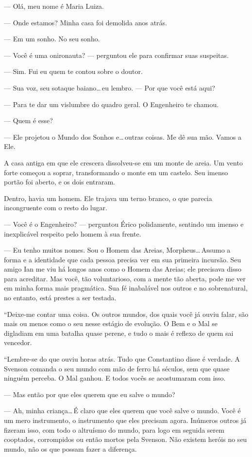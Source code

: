 --- Olá, meu nome é Maria Luiza.

--- Onde estamos? Minha casa foi demolida anos atrás.

--- Em um sonho. No seu sonho.

--- Você é uma onironauta? --- perguntou ele para confirmar suas suspeitas.

--- Sim. Fui eu quem te contou sobre o doutor.

--- Sua voz, seu sotaque baiano\ldots\,eu lembro. --- Por que você está aqui?

--- Para te dar um vislumbre do quadro geral. O Engenheiro te chamou.

--- Quem é esse?

--- Ele projetou o Mundo dos Sonhos e\ldots\,outras coisas. Me dê sua mão.
Vamos a Ele.

A casa antiga em que ele crescera dissolveu-se em um monte de areia. Um vento
forte começou a soprar, transformando o monte em um castelo. Seu imenso portão
foi aberto, e os dois entraram.

Dentro, havia um homem. Ele trajava um terno branco, o que parecia incongruente
com o resto do lugar.

--- Você é o Engenheiro? --- perguntou Érico polidamente, sentindo um imenso e
inexplicável respeito pelo homem à sua frente.

--- Eu tenho muitos nomes. Sou o Homem das Areias, Morpheus\ldots\,Assumo a
forma e a identidade que cada pessoa precisa ver em sua primeira incursão. Seu
amigo Ian me viu há longos anos como o Homem das Areias; ele precisava disso
para acreditar. Mas você, tão voluntarioso, com a mente tão aberta, pode me ver
em minha forma mais pragmática. Sua fé inabalável nos outros e no sobrenatural,
no entanto, está prestes a ser testada.

“Deixe-me contar uma coisa. Os outros mundos, dos quais você já ouviu falar,
são mais ou menos como o seu nesse estágio de evolução. O Bem e o Mal se
digladiam em uma batalha quase perene, e tudo o mais é reflexo de quem sai
vencedor.

“Lembre-se do que ouviu horas atrás. Tudo que Constantino disse é verdade. A
Svenson comanda o seu mundo com mão de ferro há séculos, sem que quase ninguém
perceba. O Mal ganhou. E todos vocês se acostumaram com isso.

--- Mas então por que eles querem que eu salve o mundo?

--- Ah, minha criança\ldots\,É claro que eles querem que você salve o mundo.
Você é um mero instrumento, o instrumento que eles precisam agora. Inúmeros
outros já fizeram isso, com todo o altruísmo do mundo, para logo em seguida
serem cooptados, corrompidos ou então mortos pela Svenson. Não existem heróis
no seu mundo, não os que possam fazer a diferença.

